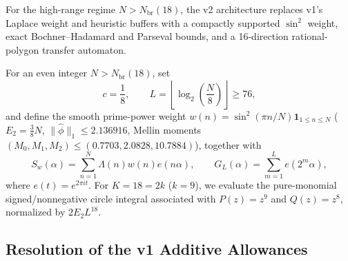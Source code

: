 \documentclass[11pt,a4paper]{article}
\begin{document}
For the high-range regime $N > N_{\mathrm{br}}(18)$, the v2 architecture replaces v1's Laplace weight and heuristic buffers with a compactly supported $\sin^2$ weight, exact Bochner--Hadamard and Parseval bounds, and a 16-direction rational-polygon transfer automaton.

For an even integer $N > N_{\mathrm{br}}(18)$, set
\[
  c = \frac{1}{8}, \qquad L = \left\lfloor \log_2\!\left(\frac{N}{8}\right) \right\rfloor \ge 76,
\]
and define the smooth prime-power weight $w(n) = \sin^2(\pi n/N)\mathbf{1}_{1 \le n \le N}$ ($E_2 = \frac{3}{8}N$, $\|\hat\phi\|_1 \le 2.136916$, Mellin moments $(M_0, M_1, M_2) \le (0.7703, 2.0828, 10.7884)$), together with
\[
  S_w(\alpha) = \sum_{n=1}^{N} \Lambda(n) w(n) e(n\alpha), \qquad G_L(\alpha) = \sum_{m=1}^{L} e(2^m \alpha),
\]
where $e(t) = e^{2\pi i t}$. For $K = 18 = 2k$ ($k = 9$), we evaluate the pure-monomial signed/nonnegative circle integral associated with $P(z) = z^9$ and $Q(z) = z^8$, normalized by $2 E_2 L^{18}$.

\subsection{Resolution of the v1 Additive Allowances}
\end{document}
